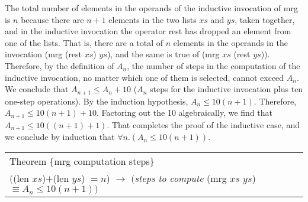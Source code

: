 The total number of elements in the operands
of the inductive invocation of \textsf{mrg}
is $n$ because there are $n+1$ elements in the two lists $xs$ and $ys$,
taken together, and in the inductive invocation the operator \textsf{rest} has
dropped an element from one of the lists.
That is, there are a total of $n$ elements in the operands
in the invocation \textsf{(mrg (rest $xs$) $ys$)},
and the same is true of \textsf{(mrg $xs$ (rest $ys$))}.
Therefore, by the definition of $A_n$,
the number of steps in the computation of the inductive invocation,
no matter which one of them is selected, cannot exceed $A_n$.
We conclude that $A_{n+1} \leq A_n + 10$
($A_n$ steps for the inductive invocation
plus ten one-step operations).
By the induction hypothesis, $A_n \leq 10(n+1)$.
Therefore, $A_{n+1} \leq 10(n+1) + 10$.
Factoring out the 10 algebraically,
we find that $A_{n+1} \leq 10((n+1) + 1)$.
That completes the proof of the inductive case,
and we conclude by induction that $\forall n.(A_n \leq 10(n+1))$.
\label{thm:mrg-computation-time}\label{thm:mrg-steps}
\begin{center}
\begin{tabular}{l}
Theorem \{mrg computation steps\}\\
$($\textsf{(len $xs$)}$+$\textsf{(len $ys$)} $= n$) $\rightarrow$ $($\emph{steps to compute} \textsf{(mrg $xs$ $ys$)} $\equiv A_n \leq 10(n+1))$\\
\end{tabular}
\end{center}

